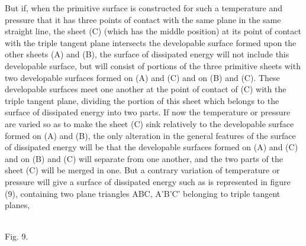 \documentclass[11pt]{article}
\begin{document}
But if, when the primitive surface is constructed for such a temperature and pressure that it has three points of contact with the same plane in the same straight line, the sheet (C) (which has the middle position) at its point of contact with the triple tangent plane intersects the developable surface formed upon the other sheets (A) and (B), the surface of dissipated energy will not include this developable surface, but will consist of portions of the three primitive sheets with two developable surfaces formed on (A) and (C) and on (B) and (C). These developable surfaces meet one another at the point of contact of (C) with the triple tangent plane, dividing the portion of this sheet which belongs to the surface of dissipated energy into two parts. If now the temperature or pressure are varied so as to make the sheet (C) sink relatively to the developable surface formed on (A) and (B), the only alteration in the general features of the surface of dissipated energy will be that the developable surfaces formed on (A) and (C) and on (B) and (C) will separate from one another, and the two parts of the sheet (C) will be merged in one. But a contrary variation of temperature or pressure will give a surface of dissipated energy such as is represented in figure (9), containing two plane triangles ABC, A'B'C' belonging to triple tangent planes,

\begin{center}\label{fig:gibbs-v1-p3-fig9}
\begin{minipage}{0.50\linewidth}\centering
{}\\[-0.15em]
{\small Fig. 9.}
\end{minipage}
\end{center}
\end{document}
